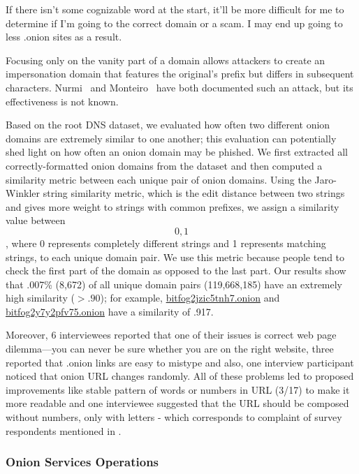 \begin{displayquote}
If there isn't some cognizable word at the start, it'll be more difficult for me
to determine if I'm going to the correct domain or a scam. I may end up going to
less .onion sites as a result.
\end{displayquote}

Focusing only on the vanity part of a domain allows attackers to create an
impersonation domain that features the original's prefix but differs in
subsequent characters.  Nurmi~\cite{Nurmi2015a} and
Monteiro~\cite{Monteiro2016a} have both documented such an attack, but its
effectiveness is not known.

Based on the root DNS dataset, we evaluated how often two different onion
domains are extremely similar to one another; this evaluation can potentially
shed light on how often an onion domain may be phished.  We first extracted all
correctly-formatted onion domains from the dataset and then computed a
similarity metric between each unique pair of onion domains.  Using the
Jaro-Winkler string similarity metric, which is the edit distance between two
strings and gives more weight to strings with common prefixes, we assign a
similarity value between \[0,1\], where 0 represents completely different
strings and 1 represents matching strings, to each unique domain pair. We use
this metric because people tend to check the first part of the domain as opposed
to the last part.  Our results show that .007\% (8,672) of all unique domain
pairs (119,668,185) have an extremely high similarity ($> .90$); for example,
\url{bitfog2jzic5tnh7.onion} and \url{bitfog2y7y2pfv75.onion} have a similarity
of .917.

Moreover, 6 interviewees reported that one of their issues is correct web page
dilemma---you can never be sure whether you are on the right website, three
reported that .onion links are easy to mistype and also, one interview
participant noticed that onion URL changes randomly. All of these problems led
to proposed improvements like stable pattern of words or numbers in URL (3/17)
to make it more readable and one interviewee suggested that the URL should be
composed without numbers, only with letters - which corresponds to complaint of
survey respondents mentioned in .

\subsubsection{Onion Services Operations}

